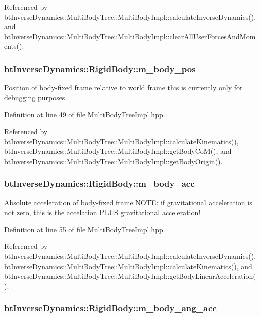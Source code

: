 Referenced by btInverseDynamics::MultiBodyTree::MultiBodyImpl::calculateInverseDynamics(), and btInverseDynamics::MultiBodyTree::MultiBodyImpl::clearAllUserForcesAndMoments().\hypertarget{structbt_inverse_dynamics_1_1_rigid_body_be1a189ee858529b691fe72beb819e5f}{
\subsubsection[m\_\-body\_\-pos]{ {\bf btInverseDynamics::RigidBody::m\_\-body\_\-pos}}}
\label{structbt_inverse_dynamics_1_1_rigid_body_be1a189ee858529b691fe72beb819e5f}


Position of body-fixed frame relative to world frame this is currently only for debugging purposes 

Definition at line 49 of file MultiBodyTreeImpl.hpp.

Referenced by btInverseDynamics::MultiBodyTree::MultiBodyImpl::calculateKinematics(), btInverseDynamics::MultiBodyTree::MultiBodyImpl::getBodyCoM(), and btInverseDynamics::MultiBodyTree::MultiBodyImpl::getBodyOrigin().\hypertarget{structbt_inverse_dynamics_1_1_rigid_body_67bb39b2dbbd0180395b251bdbae00c7}{
\subsubsection[m\_\-body\_\-acc]{ {\bf btInverseDynamics::RigidBody::m\_\-body\_\-acc}}}
\label{structbt_inverse_dynamics_1_1_rigid_body_67bb39b2dbbd0180395b251bdbae00c7}


Absolute acceleration of body-fixed frame NOTE: if gravitational acceleration is not zero, this is the accelation PLUS gravitational acceleration! 

Definition at line 55 of file MultiBodyTreeImpl.hpp.

Referenced by btInverseDynamics::MultiBodyTree::MultiBodyImpl::calculateInverseDynamics(), btInverseDynamics::MultiBodyTree::MultiBodyImpl::calculateKinematics(), and btInverseDynamics::MultiBodyTree::MultiBodyImpl::getBodyLinearAcceleration().\hypertarget{structbt_inverse_dynamics_1_1_rigid_body_8d32f2b5bcdf5f3a2566343de43ebb71}{
\subsubsection[m\_\-body\_\-ang\_\-acc]{ {\bf btInverseDynamics::RigidBody::m\_\-body\_\-ang\_\-acc}}}
\label{structbt_inverse_dynamics_1_1_rigid_body_8d32f2b5bcdf5f3a2566343de43ebb71}


